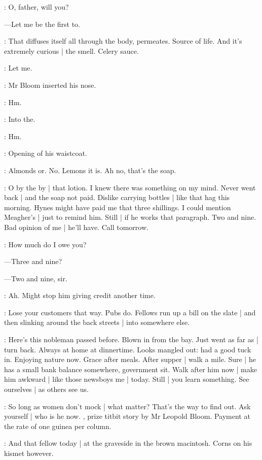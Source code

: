\BloomOther:
O,
father,
will you?

---Let me be the first to.

\BloomAbstract:
That diffuses itself all through the body,
permeates.%
Source of life.
And it's extremely curious |
the smell.
Celery sauce.

\BloomOther:
Let me.

:
Mr Bloom inserted his nose.

\BloomInt:
Hm.

:
Into the.

\BloomInt:
Hm.

:
Opening of his waistcoat.

\BloomCurrent:
Almonds or.
No.
Lemons
it is.
Ah no,
that's the soap.

\BloomToday:
O by the by |
that lotion.
I knew there was something on my mind.
Never went back |
and the soap not paid.
Dislike carrying bottles |
like that hag this morning.
Hynes might have paid me that three shillings.
I could mention Meagher's |
just to remind him.
Still |
if he works that paragraph.
Two and nine.
Bad opinion of me |
he'll have.
Call tomorrow.

\BloomOther:
How much do I owe you?

---Three and nine?

---Two and nine,
sir.

\BloomToday:
Ah.
Might stop him giving credit another time.

\BloomAbstract:
Lose your customers that way.%
Pubs do.
Fellows run up a bill on the slate |
and then slinking around the back streets |
into somewhere else.

\BloomCurrent:
Here's this nobleman passed before.
Blown in from the bay.
Just went as far as |
turn back.
Always at home at dinnertime.
Looks mangled out:
had a good tuck in.
Enjoying nature now.
Grace after meals.
After supper |
walk a mile.
Sure |
he has a small bank balance somewhere,
government sit.
Walk after him now |
make him awkward |
like those newsboys me |
today.
Still |
you learn something.
See ourselves |
as others see us.

\BloomAbstract:
So long as women don't mock |
what matter?
That's the way to find out.
Ask yourself |
who is he now.
,%
prize titbit story
by Mr Leopold Bloom.
Payment at the rate of one guinea per column.

\BloomToday:
And that fellow today |
at the graveside in the brown macintosh.
Corns on his kismet however.

